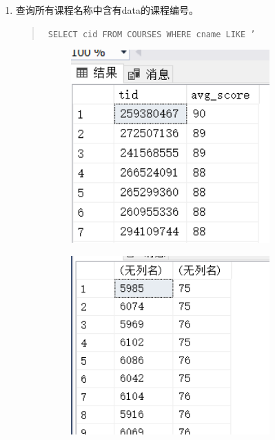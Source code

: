 \documentclass[a4paper,twoside]{article}
\begin{document}
\begin{spacing}{1.2}
\begin{enumerate}
\item 查询所有课程名称中含有data的课程编号。
\begin{quote}
\texttt{
SELECT cid
FROM COURSES
WHERE cname LIKE '%
}
\end{quote}


\begin{figure}[h]
\centering
\caption{运行结果}
\begin{subfigure}{0.3\textwidth}
  \includegraphics[width=0.9\textwidth]{fig7.png}
\end{subfigure}
\begin{subfigure}{0.3\textwidth}
  \includegraphics[width=0.9\textwidth]{fig8.png}
\end{subfigure}
\end{figure}



\end{enumerate}
\end{spacing}
\end{document}
